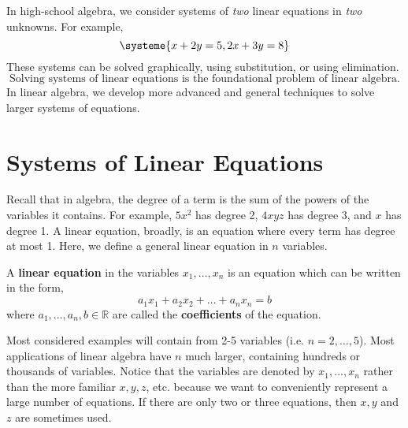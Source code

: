 \documentclass[letterpaper,12pt]{article}
\begin{document}
In high-school algebra, we consider systems of \textit{two} linear equations in \textit{two} unknowns. For example,
\begin{equation*}
    \systeme{x + 2y = 5, 2x + 3y = 8}
\end{equation*}
These systems can be solved graphically, using substitution, or using elimination.
\begin{equation*}
    \boxed{\text{Solving systems of linear equations is the foundational problem of linear algebra.}}
\end{equation*}
In linear algebra, we develop more advanced and general techniques to solve larger systems of equations.

\section*{Systems of Linear Equations}

Recall that in algebra, the degree of a term is the sum of the powers of the variables it contains. For example, $5x^2$ has degree 2, $4xyz$ has degree 3, and $x$ has degree 1. A linear equation, broadly, is an equation where every term has degree at most 1. Here, we define a general linear equation in $n$ variables.

\begin{definition}
A \textbf{linear equation} in the variables $x_1, \dots, x_n$ is an equation which can be written in the form,
\begin{equation*}
    a_1 x_1 + a_2 x_2 + \dots + a_n x_n = b
\end{equation*}
where $a_1, \dots, a_n, b \in \mathbb{R}$ are called the \textbf{coefficients} of the equation.
\end{definition}

Most considered examples will contain from 2-5 variables (i.e. $n = 2, \dots, 5$). Most applications of linear algebra have $n$ much larger, containing hundreds or thousands of variables. Notice that the variables are denoted by $x_1, \dots, x_n$ rather than the more familiar $x, y, z$, etc. because we want to conveniently represent a large number of equations. If there are only two or three equations, then $x, y$ and $z$ are sometimes used.
\end{document}
